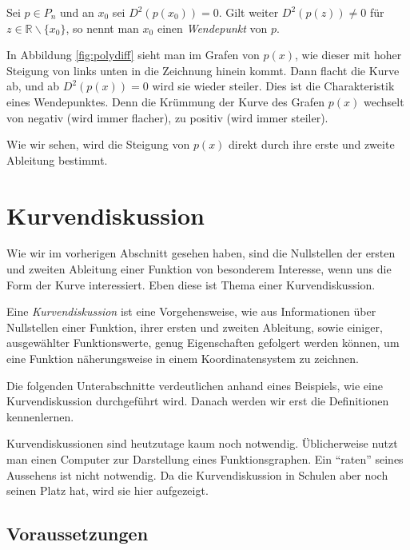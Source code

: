 \begin{definition}
Sei $p \in P_n$ und an $x_0$ sei $D^2(p(x_0))=0$. Gilt weiter $D^2(p(z))\ne 0$ für $z\in \mathbb{R}\backslash \{x_0\}$, so nennt man $x_0$ einen \textsl{Wendepunkt} von $p$.
\end{definition}

In Abbildung \ref{fig:polydiff} sieht man im Grafen von $p(x)$, wie dieser mit hoher Steigung von links unten in die Zeichnung hinein kommt. Dann flacht die Kurve ab, und ab $D^2(p(x))=0$ wird sie wieder steiler. Dies ist die Charakteristik eines Wendepunktes. Denn die Krümmung der Kurve des Grafen $p(x)$ wechselt von negativ (wird immer flacher), zu positiv (wird immer steiler).

Wie wir sehen, wird die Steigung von $p(x)$ direkt durch ihre erste und zweite Ableitung bestimmt.

\section{Kurvendiskussion}

Wie wir im vorherigen Abschnitt gesehen haben, sind die Nullstellen der ersten und zweiten Ableitung einer Funktion von besonderem Interesse, wenn uns die Form der Kurve interessiert. Eben diese ist Thema einer Kurvendiskussion.

\begin{definition}
Eine \textsl{Kurvendiskussion} ist eine Vorgehensweise, wie aus Informationen über Nullstellen einer Funktion, ihrer ersten und zweiten Ableitung, sowie einiger, ausgewählter Funktionswerte, genug Eigenschaften gefolgert werden können, um eine Funktion näherungsweise in einem Koordinatensystem zu zeichnen.
\end{definition}

Die folgenden Unterabschnitte verdeutlichen anhand eines Beispiels, wie eine Kurvendiskussion durchgeführt wird. Danach werden wir erst die Definitionen kennenlernen. 

Kurvendiskussionen sind heutzutage kaum noch notwendig. Üblicherweise nutzt man einen Computer zur Darstellung eines Funktionsgraphen. Ein "`raten"' seines Aussehens ist nicht notwendig. Da die Kurvendiskussion in Schulen aber noch seinen Platz hat, wird sie hier aufgezeigt. 

\subsection{Voraussetzungen}

